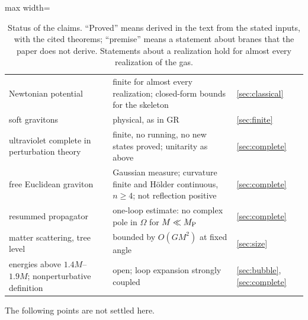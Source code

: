 \documentclass[a4paper,11pt]{article}
\begin{document}
\begin{table}[tp]
\begin{adjustbox}{max width=\linewidth}
\begin{tabular}{p{4.6cm}p{9.9cm}p{2.0cm}}
Newtonian potential & finite for almost every realization; closed-form bounds for the skeleton & \ref{sec:classical}\\
soft gravitons & physical, as in GR & \ref{sec:finite}\\
ultraviolet complete in perturbation theory & finite, no running, no new states proved; unitarity as above & \ref{sec:complete}\\
free Euclidean graviton & Gaussian measure; curvature finite and H\"older continuous, $n\ge4$; not reflection positive & \ref{sec:complete}\\
resummed propagator & one-loop estimate: no complex pole in $\Omega$ for $M\ll M_{\rm P}$ & \ref{sec:complete}\\
matter scattering, tree level & bounded by $O(GM^2)$ at fixed angle & \ref{sec:size}\\
energies above $1.4M$--$1.9M$; nonperturbative definition & open; loop expansion strongly coupled & \ref{sec:bubble}, \ref{sec:complete}\\
\hline\hline
\end{tabular}\end{adjustbox}
\caption{Status of the claims. ``Proved'' means derived in the text from the stated inputs, with the cited theorems; ``premise'' means a statement about branes that the paper does not derive. Statements about a realization hold for almost every realization of the gas.}
\label{tab:status}
\end{table}

The following points are not settled here.
\end{document}
